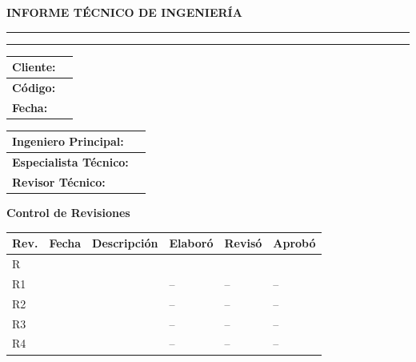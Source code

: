 \begin{titlepage}
	\thispagestyle{corporativo}

	\centering
	\vspace*{2cm}

	{\Large\bfseries INFORME TÉCNICO DE INGENIERÍA}

	\vspace{1cm}
	\rule{\linewidth}{0.4pt}

	\vspace{0.6cm}
	{\huge\bfseries \projecttitle}

	\vspace{0.6cm}
	\rule{\linewidth}{0.4pt}

	\vspace{2cm}

	\begin{flushleft}
	\begin{tabular}{@{}ll@{}}
		\toprule
		\textbf{Cliente:} & \targetcompany \\
		\midrule
		\textbf{Código:} & \documentcode \\
		\midrule
		\textbf{Fecha:} & \docFecha \\
		\bottomrule
	\end{tabular}
	\end{flushleft}

	\vspace{2cm}

	\begin{flushleft}
	\begin{tabular}{@{}ll@{}}
		\toprule
		\textbf{Ingeniero Principal:} & \firmaAprobo \\
		\midrule
		\textbf{Especialista Técnico:} & \firmaElaboro \\
		\midrule
		\textbf{Revisor Técnico:} & \firmaReviso \\
		\bottomrule
	\end{tabular}
	\end{flushleft}

	\vfill

	\noindent
	\textbf{Control de Revisiones}
	\label{tab:control_revisiones}
	\begin{tabularx}{\textwidth}{@{}llXlll@{}}
		\toprule
		\rowcolor{green!15}
		\textbf{Rev.} & \textbf{Fecha} & \textbf{Descripción} & \textbf{Elaboró} & \textbf{Revisó} & \textbf{Aprobó} \\
		\midrule
		R\docRevision & \fechaRevCero & \descRevCero & \firmaElaboro & \firmaReviso & \firmaAprobo \\
		R1 & \fechaRevUno & \descRevUno & -- & -- & -- \\
		R2 & \fechaRevDos & \descRevDos & -- & -- & -- \\
		R3 & \fechaRevTres & \descRevTres & -- & -- & -- \\
		R4 & \fechaRevCuatro & \descRevCuatro & -- & -- & -- \\
		\bottomrule
	\end{tabularx}

\end{titlepage}

\newpage
